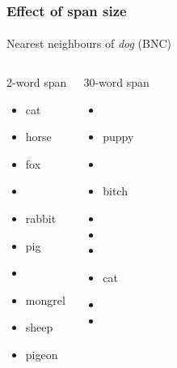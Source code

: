 \documentclass[t]{beamer} %
\begin{document}
\begin{frame}
  \frametitle{Effect of span size}
  \framesubtitle{}

  \centering
  Nearest neighbours of \emph{dog} (BNC)
  \footnotesize
  \begin{columns}[t]
    \column{4cm}
    \begin{block}{2-word span}
      \begin{itemize}
      \item cat
      \item horse
      \item fox
      \item {}
      \item rabbit
      \item pig
      \item {}
      \item mongrel
      \item sheep
      \item pigeon
      \end{itemize}
    \end{block}
    \column{4cm}
    \begin{block}{30-word span}
      \begin{itemize}
      \item {}
      \item puppy
      \item {}
      \item bitch
      \item {}
      \item {}
      \item {}
      \item cat
      \item {}
      \item {}
      \end{itemize}
    \end{block}
  \end{columns}
\end{frame}
\end{document}
